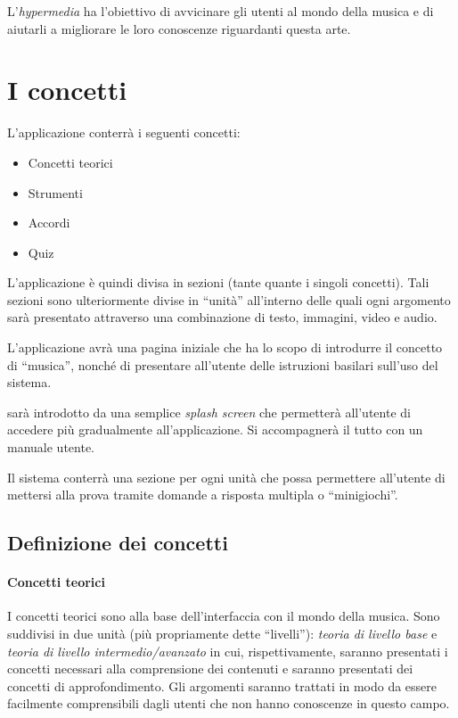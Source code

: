 L'\textit{hypermedia} \ProjectTitle{} ha l'obiettivo di avvicinare gli utenti al
mondo della musica e di aiutarli a migliorare le loro conoscenze riguardanti
questa arte.
\section{I concetti}
L'applicazione conterrà i seguenti concetti:
\begin{itemize}
	\item Concetti teorici
	\item Strumenti
	\item Accordi
	\item Quiz
\end{itemize}

L'applicazione è quindi divisa in sezioni (tante quante i singoli concetti).
Tali sezioni sono ulteriormente divise in ``unità'' all'interno delle quali ogni
argomento sarà presentato attraverso una combinazione di testo, immagini, video
e audio.

L'applicazione avrà una pagina iniziale che ha lo scopo di introdurre il
concetto di ``musica'', nonché di presentare all'utente delle istruzioni
basilari sull'uso del sistema.

\ProjectTitle{} sarà introdotto da una semplice \textit{splash screen} che
permetterà all'utente di accedere più gradualmente all'applicazione. Si
accompagnerà il tutto con un manuale utente.

Il sistema conterrà una sezione per ogni unità che possa permettere all'utente
di mettersi alla prova tramite domande a risposta multipla o ``minigiochi''.

\subsection{Definizione dei concetti}

\paragraph{Concetti teorici} I concetti teorici sono alla base dell'interfaccia
con il mondo della musica. Sono suddivisi in due unità (più propriamente dette
``livelli''): \textit{teoria di livello base} e \textit{teoria di livello
intermedio/avanzato} in cui, rispettivamente, saranno presentati i concetti
necessari alla comprensione dei contenuti e saranno presentati dei concetti di
approfondimento. Gli argomenti saranno trattati in modo da essere facilmente
comprensibili dagli utenti che non hanno conoscenze in questo campo.

